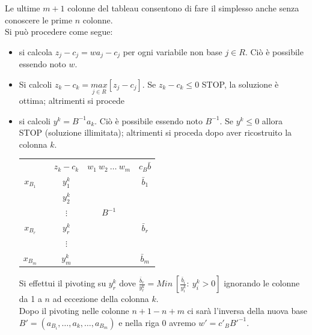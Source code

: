 Le ultime $m+1$ colonne del tableau consentono di fare il simplesso anche senza conoscere le prime $n$ colonne.\\
Si può procedere come segue:
\begin{itemize}
	\item si calcola $z_{j}-c_{j}=w a_{j}-c_{j}$ per ogni variabile non base $j\in R$. Ciò è possibile essendo noto $w$.
	\item Si calcoli $z_{k}-c_{k}=\underset{j\in R}{max}[z_{j}-c_{j}]$. Se $z_{k}-c_{k}\le 0$ STOP, la soluzione è ottima; altrimenti si procede
	\item si calcoli $y^{k}=B^{-1}a_{k}$. Ciò è possibile essendo noto $B^{-1}$.
	Se $y^{k}\le 0$ allora STOP (soluzione illimitata); altrimenti si proceda dopo aver ricostruito la colonna $k$.
	\begin{table}[h]
		\centering
		\begin{tabular}{c|c|c|c|c|}
			\cline{2-5}
			& & $z_{k}-c_{k}$ & $w_{1}\ w_{2}\ \dots\ w_{m}$ & $c_{B}\bar{b}$ \\ \cline{2-5}
			$x_{B_{1}}$ & & $y^{k}_{1}$ & & $\bar{b}_{1}$ \\
			&  & $y^{k}_{2}$ & & \\
			&  & $\vdots$ & $B^{-1}$ & \\
			$x_{B_{r}}$ & & $y^{k}_{r}$ &  & $\bar{b}_{r}$ \\
			&  & $\vdots$ &  & \\
			$x_{B_{m}}$ & & $y^{k}_{m}$ & & $\bar{b}_{m}$ \\ \cline{2-5}
		\end{tabular}
	\end{table}
	
	Si effettui il pivoting su $y_{r}^{k}$ dove $\frac{\bar{b}_{r}}{y_{r}^{k}}=Min\ [\frac{\bar{b}_{i}}{y^{k}_{i}}:\ y_{i}^{k}>0]$ ignorando le colonne da 1 a $n$ ad eccezione della colonna $k$.\\
	Dopo il pivoting nelle colonne $n+1-n+m$ ci sarà l'inversa della nuova base\\ $B'=(a_{B_{i}},\dots,a_{k},\dots,a_{B_{m}})$ e nella riga 0 avremo $w'=c'_{B}B'^{-1}$.
\end{itemize}

